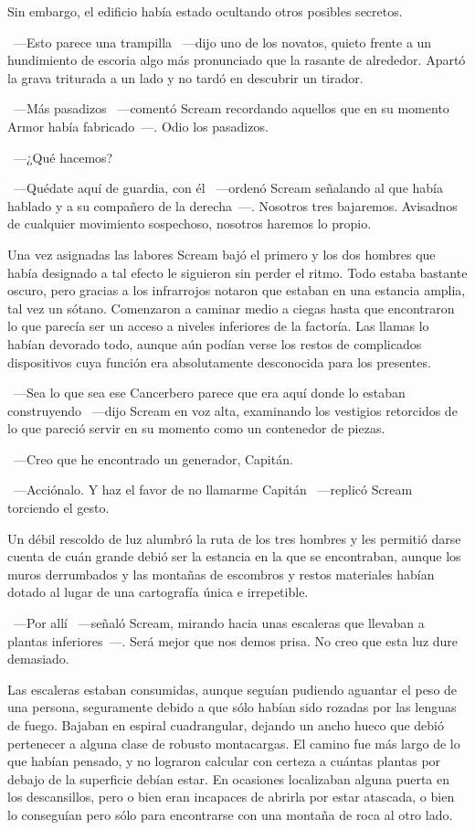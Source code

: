 Sin embargo, el edificio había estado ocultando otros posibles secretos.

~---Esto parece una trampilla ~---dijo uno de los novatos, quieto frente a un hundimiento de escoria algo más pronunciado que la rasante de alrededor. Apartó la grava triturada a un lado y no tardó en descubrir un tirador.

~---Más pasadizos ~---comentó Scream recordando aquellos que en su momento Armor había fabricado~---. Odio los pasadizos.

~---¿Qué hacemos?

~---Quédate aquí de guardia, con él ~---ordenó Scream señalando al que había hablado y a su compañero de la derecha~---. Nosotros tres bajaremos. Avisadnos de cualquier movimiento sospechoso, nosotros haremos lo propio.

Una vez asignadas las labores Scream bajó el primero y los dos hombres que había designado a tal efecto le siguieron sin perder el ritmo. Todo estaba bastante oscuro, pero gracias a los infrarrojos notaron que estaban en una estancia amplia, tal vez un sótano. Comenzaron a caminar medio a ciegas hasta que encontraron lo que parecía ser un acceso a niveles inferiores de la factoría. Las llamas lo habían devorado todo, aunque aún podían verse los restos de complicados dispositivos cuya función era absolutamente desconocida para los presentes.

~---Sea lo que sea ese Cancerbero parece que era aquí donde lo estaban construyendo ~---dijo Scream en voz alta, examinando los vestigios retorcidos de lo que pareció servir en su momento como un contenedor de piezas.

~---Creo que he encontrado un generador, Capitán.

~---Acciónalo. Y haz el favor de no llamarme Capitán ~---replicó Scream torciendo el gesto.

Un débil rescoldo de luz alumbró la ruta de los tres hombres y les permitió darse cuenta de cuán grande debió ser la estancia en la que se encontraban, aunque los muros derrumbados y las montañas de escombros y restos materiales habían dotado al lugar de una cartografía única e irrepetible.

~---Por allí ~---señaló Scream, mirando hacia unas escaleras que llevaban a plantas inferiores~---. Será mejor que nos demos prisa. No creo que esta luz dure demasiado.

Las escaleras estaban consumidas, aunque seguían pudiendo aguantar el peso de una persona, seguramente debido a que sólo habían sido rozadas por las lenguas de fuego. Bajaban en espiral cuadrangular, dejando un ancho hueco que debió pertenecer a alguna clase de robusto montacargas. El camino fue más largo de lo que habían pensado, y no lograron calcular con certeza a cuántas plantas por debajo de la superficie debían estar. En ocasiones localizaban alguna puerta en los descansillos, pero o bien eran incapaces de abrirla por estar atascada, o bien lo conseguían pero sólo para encontrarse con una montaña de roca al otro lado.


